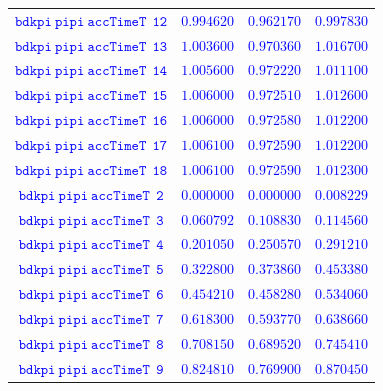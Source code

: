 \documentclass[10pt,a4paper]{article}
\begin{document}
\begin{table}[h!]
{\begin{tabular}{cccc}
\textcolor{blue}{$\mathtt{bdkpi~pipi~accTimeT~~12}$} & \textcolor{blue}{$0.994620$}& \textcolor{blue}{$0.962170$}& \textcolor{blue}{$0.997830$}\\
\textcolor{blue}{$\mathtt{bdkpi~pipi~accTimeT~~13}$} & \textcolor{blue}{$1.003600$}& \textcolor{blue}{$0.970360$}& \textcolor{blue}{$1.016700$}\\
\textcolor{blue}{$\mathtt{bdkpi~pipi~accTimeT~~14}$} & \textcolor{blue}{$1.005600$}& \textcolor{blue}{$0.972220$}& \textcolor{blue}{$1.011100$}\\
\textcolor{blue}{$\mathtt{bdkpi~pipi~accTimeT~~15}$} & \textcolor{blue}{$1.006000$}& \textcolor{blue}{$0.972510$}& \textcolor{blue}{$1.012600$}\\
\textcolor{blue}{$\mathtt{bdkpi~pipi~accTimeT~~16}$} & \textcolor{blue}{$1.006000$}& \textcolor{blue}{$0.972580$}& \textcolor{blue}{$1.012200$}\\
\textcolor{blue}{$\mathtt{bdkpi~pipi~accTimeT~~17}$} & \textcolor{blue}{$1.006100$}& \textcolor{blue}{$0.972590$}& \textcolor{blue}{$1.012200$}\\
\textcolor{blue}{$\mathtt{bdkpi~pipi~accTimeT~~18}$} & \textcolor{blue}{$1.006100$}& \textcolor{blue}{$0.972590$}& \textcolor{blue}{$1.012300$}\\
\textcolor{blue}{$\mathtt{bdkpi~pipi~accTimeT~~2}$} & \textcolor{blue}{$0.000000$}& \textcolor{blue}{$0.000000$}& \textcolor{blue}{$0.008229$}\\
\textcolor{blue}{$\mathtt{bdkpi~pipi~accTimeT~~3}$} & \textcolor{blue}{$0.060792$}& \textcolor{blue}{$0.108830$}& \textcolor{blue}{$0.114560$}\\
\textcolor{blue}{$\mathtt{bdkpi~pipi~accTimeT~~4}$} & \textcolor{blue}{$0.201050$}& \textcolor{blue}{$0.250570$}& \textcolor{blue}{$0.291210$}\\
\textcolor{blue}{$\mathtt{bdkpi~pipi~accTimeT~~5}$} & \textcolor{blue}{$0.322800$}& \textcolor{blue}{$0.373860$}& \textcolor{blue}{$0.453380$}\\
\textcolor{blue}{$\mathtt{bdkpi~pipi~accTimeT~~6}$} & \textcolor{blue}{$0.454210$}& \textcolor{blue}{$0.458280$}& \textcolor{blue}{$0.534060$}\\
\textcolor{blue}{$\mathtt{bdkpi~pipi~accTimeT~~7}$} & \textcolor{blue}{$0.618300$}& \textcolor{blue}{$0.593770$}& \textcolor{blue}{$0.638660$}\\
\textcolor{blue}{$\mathtt{bdkpi~pipi~accTimeT~~8}$} & \textcolor{blue}{$0.708150$}& \textcolor{blue}{$0.689520$}& \textcolor{blue}{$0.745410$}\\
\textcolor{blue}{$\mathtt{bdkpi~pipi~accTimeT~~9}$} & \textcolor{blue}{$0.824810$}& \textcolor{blue}{$0.769900$}& \textcolor{blue}{$0.870450$}\\

\end{tabular}}
\end{table}
\end{document}
